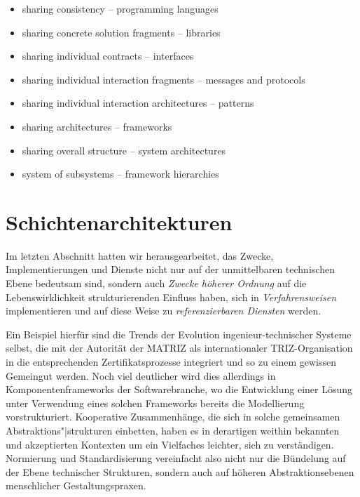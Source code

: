 \documentclass[12pt,a4paper]{article}
\begin{document}
\begin{itemize}\itemsep0pt
\item sharing consistency -- programming languages
\item sharing concrete solution fragments -- libraries
\item sharing individual contracts -- interfaces
\item sharing individual interaction fragments -- messages and protocols
\item sharing individual interaction architectures -- patterns
\item sharing architectures -- frameworks
\item sharing overall structure -- system architectures
\item system of subsystems -- framework hierarchies
\end{itemize}

\section{Schichtenarchitekturen}

Im letzten Abschnitt hatten wir herausgearbeitet, das Zwecke,
Implementierungen und Dienste nicht nur auf der unmittelbaren technischen
Ebene bedeutsam sind, sondern auch \emph{Zwecke höherer Ordnung} auf die
Lebenswirklichkeit strukturierenden Einfluss haben, sich in
\emph{Verfahrensweisen} implementieren und auf diese Weise zu
\emph{referenzierbaren Diensten} werden.

Ein Beispiel hierfür sind die Trends der Evolution ingenieur-technischer
Systeme \cite{TESE2018} selbst, die mit der Autorität der MATRIZ als
internationaler TRIZ-Organisation in die entsprechenden Zertifikatsprozesse
integriert und so zu einem gewissen Gemeingut werden.  Noch viel deutlicher
wird dies allerdings in Komponentenframeworks der Softwarebranche, wo die
Entwicklung einer Lösung unter Verwendung eines solchen Frameworks bereits die
Modellierung vorstrukturiert. Kooperative Zusammenhänge, die sich in solche
gemeinsamen Abstraktions"|strukturen einbetten, haben es in derartigen weithin
bekannten und akzeptierten Kontexten um ein Vielfaches leichter, sich zu
verständigen.  Normierung und Standardisierung vereinfacht also nicht nur die
Bündelung auf der Ebene technischer Strukturen, sondern auch auf höheren
Abstraktionsebenen menschlicher Gestaltungspraxen.
\end{document}
